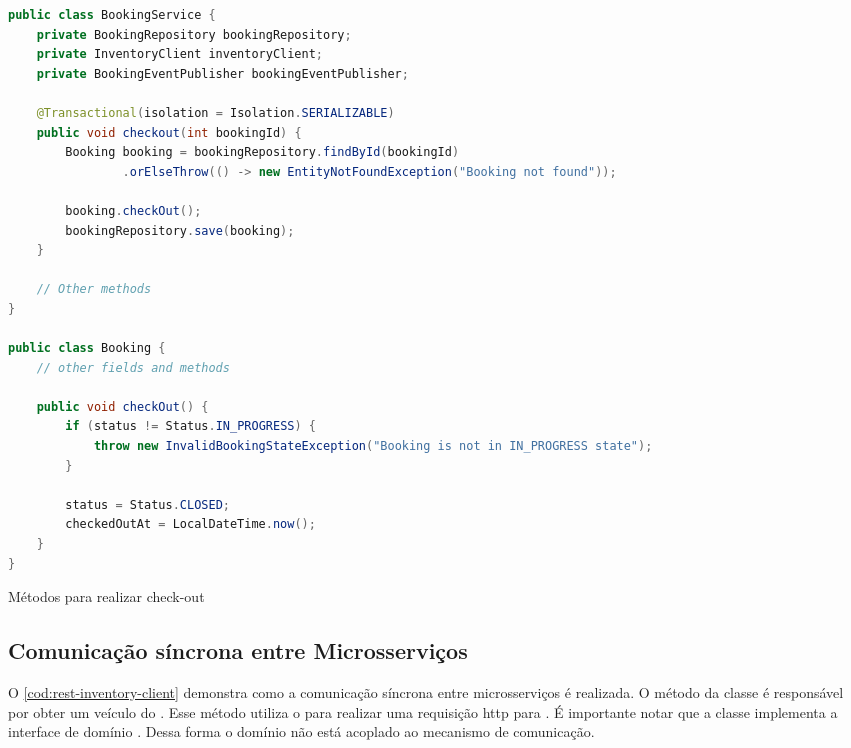 \begin{codigo}[H]
    \begin{lstlisting}[language=Java]
public class BookingService {
    private BookingRepository bookingRepository;
    private InventoryClient inventoryClient;
    private BookingEventPublisher bookingEventPublisher;

    @Transactional(isolation = Isolation.SERIALIZABLE)
    public void checkout(int bookingId) {
        Booking booking = bookingRepository.findById(bookingId)
                .orElseThrow(() -> new EntityNotFoundException("Booking not found"));

        booking.checkOut();
        bookingRepository.save(booking);
    }

    // Other methods
}

public class Booking {
    // other fields and methods

    public void checkOut() {
        if (status != Status.IN_PROGRESS) {
            throw new InvalidBookingStateException("Booking is not in IN_PROGRESS state");
        }

        status = Status.CLOSED;
        checkedOutAt = LocalDateTime.now();
    }
}
    \end{lstlisting}
    \caption{Métodos para realizar check-out}
    \label{cod:realizar-check-out}
\end{codigo}

\subsection{Comunicação síncrona entre Microsserviços}
O \autoref{cod:rest-inventory-client} demonstra como a comunicação síncrona entre microsserviços é realizada. O método  da classe  é responsável por obter um veículo do . Esse método utiliza o  para realizar uma requisição \acrshort{http} para . É importante notar que a classe  implementa a interface de domínio . Dessa forma o domínio não está acoplado ao mecanismo de comunicação.

